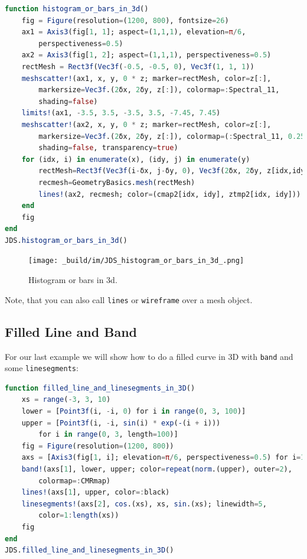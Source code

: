 \documentclass[
  notoc %
]{tufte-book}
\newcommand{\passthrough}[1]{#1}
\begin{document}
\begin{lstlisting}[language=Julia]
function histogram_or_bars_in_3d()
    fig = Figure(resolution=(1200, 800), fontsize=26)
    ax1 = Axis3(fig[1, 1]; aspect=(1,1,1), elevation=π/6,
        perspectiveness=0.5)
    ax2 = Axis3(fig[1, 2]; aspect=(1,1,1), perspectiveness=0.5)
    rectMesh = Rect3f(Vec3f(-0.5, -0.5, 0), Vec3f(1, 1, 1))
    meshscatter!(ax1, x, y, 0 * z; marker=rectMesh, color=z[:],
        markersize=Vec3f.(2δx, 2δy, z[:]), colormap=:Spectral_11,
        shading=false)
    limits!(ax1, -3.5, 3.5, -3.5, 3.5, -7.45, 7.45)
    meshscatter!(ax2, x, y, 0 * z; marker=rectMesh, color=z[:],
        markersize=Vec3f.(2δx, 2δy, z[:]), colormap=(:Spectral_11, 0.25),
        shading=false, transparency=true)
    for (idx, i) in enumerate(x), (idy, j) in enumerate(y)
        rectMesh=Rect3f(Vec3f(i-δx, j-δy, 0), Vec3f(2δx, 2δy, z[idx,idy]))
        recmesh=GeometryBasics.mesh(rectMesh)
        lines!(ax2, recmesh; color=(cmap2[idx, idy], ztmp2[idx, idy]))
    end
    fig
end
JDS.histogram_or_bars_in_3d()
\end{lstlisting}

\begin{figure}
\hypertarget{fig:histogram_or_bars_in_3d}{%
\centering
\texttt{[image: \_build/im/JDS\_histogram\_or\_bars\_in\_3d\_.png]}
\caption{Histogram or bars in 3d.}\label{fig:histogram_or_bars_in_3d}
}
\end{figure}

Note, that you can also call \passthrough{\lstinline!lines!} or
\passthrough{\lstinline!wireframe!} over a mesh object.

\hypertarget{filled-line-and-band}{%
\subsection{Filled Line and Band}\label{filled-line-and-band}}

For our last example we will show how to do a filled curve in 3D with
\passthrough{\lstinline!band!} and some
\passthrough{\lstinline!linesegments!}:

\begin{lstlisting}[language=Julia]
function filled_line_and_linesegments_in_3D()
    xs = range(-3, 3, 10)
    lower = [Point3f(i, -i, 0) for i in range(0, 3, 100)]
    upper = [Point3f(i, -i, sin(i) * exp(-(i + i)))
        for i in range(0, 3, length=100)]
    fig = Figure(resolution=(1200, 800))
    axs = [Axis3(fig[1, i]; elevation=π/6, perspectiveness=0.5) for i=1:2]
    band!(axs[1], lower, upper; color=repeat(norm.(upper), outer=2),
        colormap=:CMRmap)
    lines!(axs[1], upper, color=:black)
    linesegments!(axs[2], cos.(xs), xs, sin.(xs); linewidth=5,
        color=1:length(xs))
    fig
end
JDS.filled_line_and_linesegments_in_3D()
\end{lstlisting}
\end{document}

